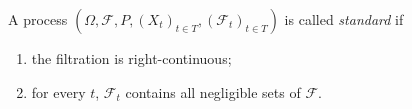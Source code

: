 \begin{definition}
	A process $(\Omega, \mathcal F, P, (X_t)_{t \in T}, (\mathcal F_t)_{t\in T})$
	is called \textit{standard} if
	\begin{enumerate}
		\item the filtration is right-continuous;
		\item for every $t$, $\mathcal F_t$ contains all negligible sets of $\mathcal F$.
	\end{enumerate}
\end{definition}
